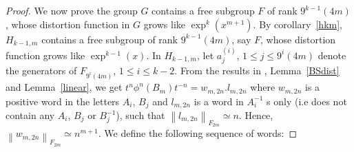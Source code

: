\documentclass[oneside,11pt,reqno]{amsart}
\theoremstyle{definition}
\newcommand{\norm}[1]{\left\lVert{#1}\right\rVert}
\begin{document}
\begin{proof}




We now prove the group $G$ contains a free subgroup $F$ of rank $9^{k-1}(4m)$, whose distortion function in $G$ grows like $\exp^k(x^{m+1})$. By corollary~\ref{hkm}, $H_{k-1,m}$ contains a free subgroup of rank $9^{k-1}(4m)$, say $F$, whose distortion function grows like $\exp^{k-1}(x)$. In $H_{k-1,m}$, let $a^{(i)}_j$, $1 \leq j \leq 9^{i}(4m)$ denote the generators of $F_{9^i(4m)}$, $1 \leq i \leq k-2$. From the results in \cite[Section 8]{BS}, Lemma~\ref{BSdist} and Lemma~\ref{linear}, we get  $t^n \phi^n(B_m) t^{-n} = w_{m,2n}.l_{m,2n}$ where $w_{m,2n}$ is a positive word in the letters $A_i$, $B_j$ and $l_{m,2n}$ is a word in $A^{-1}_i$ s only (i.e does not contain any $A_i$, $B_j$ or $B^{-1}_j$), such that $\norm{l_{m,2n}}_{F_{2m}} \simeq n$. Hence, $\norm{w_{m,2n}}_{F_{2m}} \simeq n^{m+1}$. We define the following sequence of words: 


\end{proof}
\end{document}
